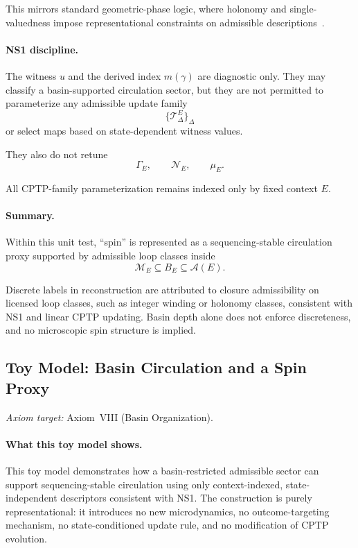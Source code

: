 \documentclass[aps,prx,onecolumn,11pt]{revtex4-2}
\theoremstyle{plain}
\theoremstyle{definition}
\theoremstyle{remark}
\begin{document}
This mirrors standard geometric-phase logic, where holonomy and
single-valuedness impose representational constraints on admissible
descriptions~\cite{Simon1983,Berry1984,Nakahara2003,Frankel2012}.

\paragraph{NS1 discipline.}

The witness \(u\) and the derived index \(m(\gamma)\) are diagnostic
only. They may classify a basin-supported circulation sector, but they
are not permitted to parameterize any admissible update family
\[
\{\mathcal T^E_\Delta\}_\Delta
\]
or select maps based on state-dependent witness values.

They also do not retune
\[
\Gamma_E,
\qquad
\mathcal N_E,
\qquad
\mu_E.
\]

All CPTP-family parameterization remains indexed only by fixed context
\(E\).

\paragraph{Summary.}

Within this unit test, ``spin'' is represented as a
sequencing-stable circulation proxy supported by admissible loop
classes inside
\[
\mathcal M_E
\subseteq
B_E
\subseteq
\mathcal A(E).
\]

Discrete labels in reconstruction are attributed to closure
admissibility on licensed loop classes, such as integer winding or
holonomy classes, consistent with NS1 and linear CPTP updating. Basin
depth alone does not enforce discreteness, and no microscopic spin
structure is implied.

\subsection{Toy Model: Basin Circulation and a Spin Proxy}
\label{toy:spin_proxy}

\noindent\emph{Axiom target:} Axiom~VIII (Basin Organization).

\paragraph{What this toy model shows.}

This toy model demonstrates how a basin-restricted admissible sector can
support sequencing-stable circulation using only context-indexed,
state-independent descriptors consistent with NS1. The construction is
purely representational: it introduces no new microdynamics, no
outcome-targeting mechanism, no state-conditioned update rule, and no
modification of CPTP evolution.
\end{document}
